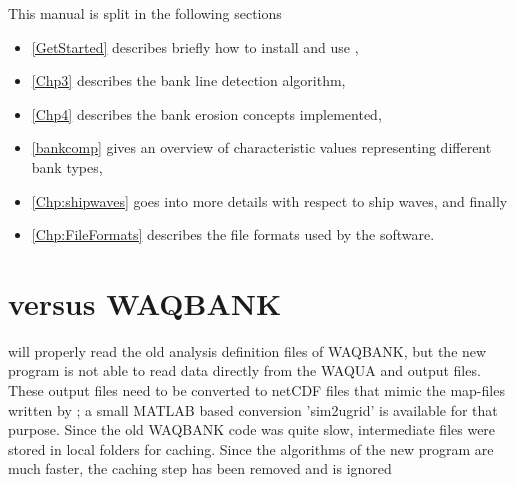 This manual is split in the following sections

\begin{itemize}
\item \autoref{GetStarted} describes briefly how to install and use \dfastbe,
\item \autoref{Chp3} describes the bank line detection algorithm,
\item \autoref{Chp4} describes the bank erosion concepts implemented,
\item \autoref{bankcomp} gives an overview of characteristic values representing different bank types,
\item \autoref{Chp:shipwaves} goes into more details with respect to ship waves, and finally
\item \autoref{Chp:FileFormats} describes the file formats used by the software.
\end{itemize}

\section{\dfastbe versus WAQBANK}

\dfastbe will properly read the old analysis definition files of WAQBANK, but the new program is not able to read data directly from the WAQUA and \dflow output files.
These output files need to be converted to netCDF files that mimic the map-files written by \dflowfm; a small MATLAB based conversion 'sim2ugrid' is available for that purpose.
Since the old WAQBANK code was quite slow, intermediate files were stored in local folders for caching.
Since the algorithms of the new \dfastbe program are much faster, the caching step has been removed and  is ignored
